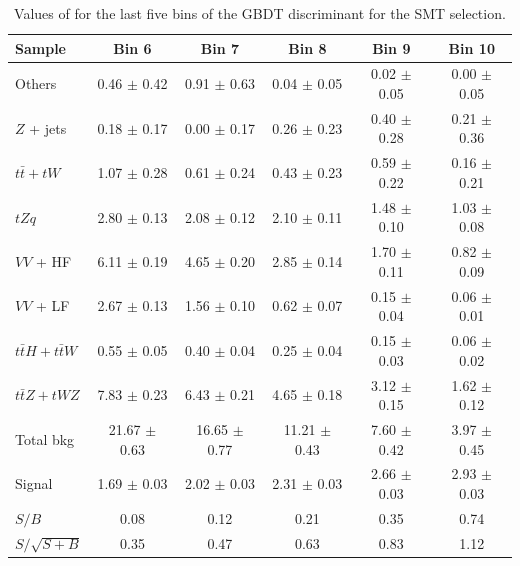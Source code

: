 \begin{table}[!h]
	\centering
	\small
\begin{tabular}{|l|c|c|c|c|c|} 
	\hline 
	Sample 			       & Bin 6            & Bin 7            & Bin 8             & Bin 9           & Bin 10          \\ 
	\hline                 
	Others & 0.46 $\pm$ 0.42 & 0.91 $\pm$ 0.63 & 0.04 $\pm$ 0.05 & 0.02 $\pm$ 0.05 & 0.00 $\pm$ 0.05 \\ 
	$Z$ + jets & 0.18 $\pm$ 0.17 & 0.00 $\pm$ 0.17 & 0.26 $\pm$ 0.23 & 0.40 $\pm$ 0.28 & 0.21 $\pm$ 0.36 \\ 
	$t\bar{t}+tW$ & 1.07 $\pm$ 0.28 & 0.61 $\pm$ 0.24 & 0.43 $\pm$ 0.23 & 0.59 $\pm$ 0.22 & 0.16 $\pm$ 0.21 \\ 
	$tZq$ & 2.80 $\pm$ 0.13 & 2.08 $\pm$ 0.12 & 2.10 $\pm$ 0.11 & 1.48 $\pm$ 0.10 & 1.03 $\pm$ 0.08 \\ 
	$VV$ + HF & 6.11 $\pm$ 0.19 & 4.65 $\pm$ 0.20 & 2.85 $\pm$ 0.14 & 1.70 $\pm$ 0.11 & 0.82 $\pm$ 0.09 \\ 
	$VV$ + LF & 2.67 $\pm$ 0.13 & 1.56 $\pm$ 0.10 & 0.62 $\pm$ 0.07 & 0.15 $\pm$ 0.04 & 0.06 $\pm$ 0.01 \\ 
	$t\bar{t}H+t\bar{t}W$ & 0.55 $\pm$ 0.05 & 0.40 $\pm$ 0.04 & 0.25 $\pm$ 0.04 & 0.15 $\pm$ 0.03 & 0.06 $\pm$ 0.02 \\ 
	$t\bar{t}Z+tWZ$ & 7.83 $\pm$ 0.23 & 6.43 $\pm$ 0.21 & 4.65 $\pm$ 0.18 & 3.12 $\pm$ 0.15 & 1.62 $\pm$ 0.12 \\ 
	\hline 
	Total bkg & 21.67 $\pm$ 0.63 & 16.65 $\pm$ 0.77 & 11.21 $\pm$ 0.43 & 7.60 $\pm$ 0.42 & 3.97 $\pm$ 0.45 \\ 
	\hline 
	Signal & 1.69 $\pm$ 0.03 & 2.02 $\pm$ 0.03 & 2.31 $\pm$ 0.03 & 2.66 $\pm$ 0.03 & 2.93 $\pm$ 0.03 \\ 
	\hline 
	$S/B$ & 0.08 & 0.12 & 0.21 & 0.35 & 0.74 \\ 
	$S/\sqrt{S+B}$ & 0.35 & 0.47 & 0.63 & 0.83 & 1.12 \\ 
	\hline 
\end{tabular} 
	\caption{Values of \ssplusb for the last five bins of the GBDT discriminant for the SMT selection.}%
\label{tab:yields:sr3_smt_bdt}
\end{table}

